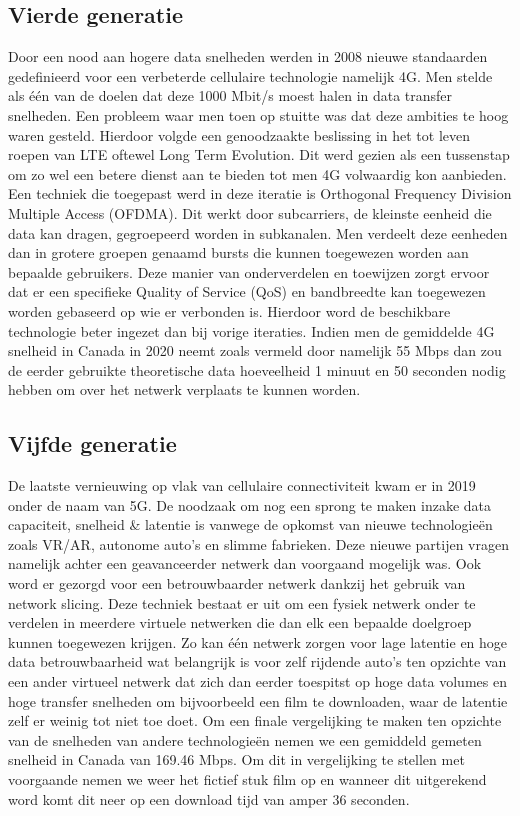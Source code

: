 \subsection{Vierde generatie}

Door een nood aan hogere data snelheden werden in 2008 nieuwe standaarden gedefinieerd voor een verbeterde cellulaire technologie namelijk 4G. Men stelde als één van de doelen dat deze 1000 Mbit/s moest halen in data transfer snelheden. Een probleem waar men toen op stuitte was dat deze ambities te hoog waren gesteld. Hierdoor volgde een genoodzaakte beslissing in het tot leven roepen van LTE oftewel Long Term Evolution. Dit werd gezien als een tussenstap om zo wel een betere dienst aan te bieden tot men 4G volwaardig kon aanbieden. \autocite{Nicholls2022} Een techniek die toegepast werd in deze iteratie is Orthogonal Frequency Division Multiple Access (OFDMA). Dit werkt door subcarriers, de kleinste eenheid die data kan dragen, gegroepeerd worden in subkanalen. Men verdeelt deze eenheden dan in grotere groepen genaamd bursts die kunnen toegewezen worden aan bepaalde gebruikers. Deze manier van onderverdelen en toewijzen zorgt ervoor dat er een specifieke Quality of Service (QoS) en bandbreedte kan toegewezen worden gebaseerd op wie er verbonden is. Hierdoor word de beschikbare technologie beter ingezet dan bij vorige iteraties. \autocite{Friedmann2007} Indien men de gemiddelde 4G snelheid in Canada in 2020 neemt zoals vermeld door \textcite{Galazzo2020} namelijk 55 Mbps dan zou de eerder gebruikte theoretische data hoeveelheid 1 minuut en 50 seconden nodig hebben om over het netwerk verplaats te kunnen worden. \autocite{Wooding2024}

\subsection{Vijfde generatie}

De laatste vernieuwing op vlak van cellulaire connectiviteit kwam er in 2019 onder de naam van 5G. De noodzaak om nog een sprong te maken inzake data capaciteit, snelheid \& latentie is vanwege de opkomst van nieuwe technologieën zoals VR/AR, autonome auto's en slimme fabrieken. Deze nieuwe partijen vragen namelijk achter een geavanceerder netwerk dan voorgaand mogelijk was. Ook word er gezorgd voor een betrouwbaarder netwerk dankzij het gebruik van network slicing. Deze techniek bestaat er uit om een fysiek netwerk onder te verdelen in meerdere virtuele netwerken die dan elk een bepaalde doelgroep kunnen toegewezen krijgen. Zo kan één netwerk zorgen voor lage latentie en hoge data betrouwbaarheid wat belangrijk is voor zelf rijdende auto's ten opzichte van een ander virtueel netwerk dat zich dan eerder toespitst op hoge data volumes en hoge transfer snelheden om bijvoorbeeld een film te downloaden, waar de latentie zelf er weinig tot niet toe doet. \autocite{Flinders2024} Om een finale vergelijking te maken ten opzichte van de snelheden van andere technologieën nemen we een gemiddeld gemeten snelheid in Canada van 169.46 Mbps. \autocite{Galazzo2020} Om dit in vergelijking te stellen met voorgaande nemen we weer het fictief stuk film op en wanneer dit uitgerekend word komt dit neer op een download tijd van amper 36 seconden. \autocite{Wooding2024}


